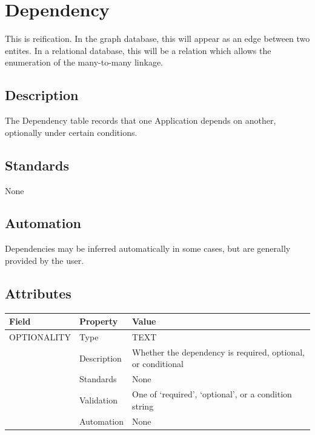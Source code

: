 \section{Dependency}\label{dependency}

This is reification. In the graph database, this will appear as an edge
between two entites. In a relational database, this will be a relation
which allows the enumeration of the many-to-many linkage.

\subsection{Description}\label{description-10}

The Dependency table records that one Application depends on another,
optionally under certain conditions.

\subsection{Standards}\label{standards-12}

None

\subsection{Automation}\label{automation-12}

Dependencies may be inferred automatically in some cases, but are
generally provided by the user.

\subsection{Attributes}\label{attributes-12}

\begin{longtable}[]{@{}
  >{\raggedright\arraybackslash}p{}
  >{\raggedright\arraybackslash}p{}
  >{\raggedright\arraybackslash}p{}@{}}
\toprule\noalign{}
\begin{minipage}[b]{\linewidth}\raggedright
Field
\end{minipage} & \begin{minipage}[b]{\linewidth}\raggedright
Property
\end{minipage} & \begin{minipage}[b]{\linewidth}\raggedright
Value
\end{minipage} \\
\midrule\noalign{}
\endhead
\bottomrule\noalign{}
\endlastfoot
OPTIONALITY & Type & TEXT \\
& Description & Whether the dependency is required, optional, or
conditional \\
& Standards & None \\
& Validation & One of `required', `optional', or a condition string \\
& Automation & None \\
\end{longtable}

